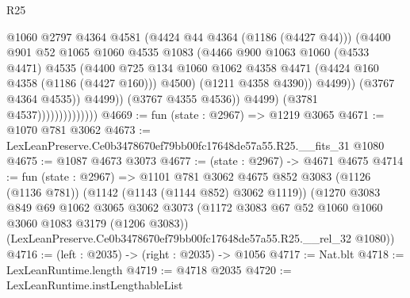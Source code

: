 \begin{lexlean}{R25}
\begin{coremodule}
                                          @1060
                                          @2797
                                          @4364
                                          @4581
                                          (@4424 @44 @4364 (@1186 (@4427 @44)))
                                          (@4400
                                            @901
                                            @52
                                            @1065
                                            @1060
                                            @4535
                                            @1083
                                            (@4466
                                              @900
                                              @1063
                                              @1060
                                              (@4533 @4471)
                                              @4535
                                              (@4400
                                                @725
                                                @134
                                                @1060
                                                @1062
                                                @4358
                                                @4471
                                                (@4424 @160 @4358 (@1186 (@4427 @160)))
                                                @4500)
                                              (@1211 @4358 @4390))
                                            @4499))
                                        (@3767 @4364 @4535))
                                      @4499))
                                  (@3767 @4355 @4536))
                                @4499)
                              (@3781 @4537))))))))))))))
@4669 := fun (state : @2967) => @1219 @3065
@4671 := @1070 @781 @3062
@4673 := LexLeanPreserve.Ce0b3478670ef79bb00fc17648de57a55.R25.__fits_31 @1080
@4675 := @1087 @4673 @3073
@4677 := (state : @2967) -> @4671 @4675
@4714 := fun (state : @2967) =>
  @1101
    @781
    @3062
    @4675
    @852
    @3083
    (@1126 (@1136 @781))
    (@1142 (@1143 (@1144 @852) @3062 @1119))
    (@1270
      @3083
      @849
      @69
      @1062
      @3065
      @3062
      @3073
      (@1172 @3083 @67 @52 @1060 @1060 @3060 @1083 @3179 (@1206 @3083))
      (LexLeanPreserve.Ce0b3478670ef79bb00fc17648de57a55.R25.__rel_32 @1080))
@4716 := (left : @2035) -> (right : @2035) -> @1056
@4717 := Nat.blt
@4718 := LexLeanRuntime.length
@4719 := @4718 @2035
@4720 := LexLeanRuntime.instLengthableList

\end{coremodule}
\end{lexlean}
